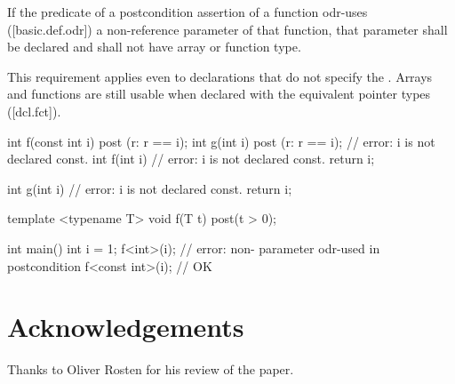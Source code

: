 \begin{adjustwidth}{0.5cm}{0.5cm}
If the predicate of a postcondition assertion of a function odr-uses ([basic.def.odr]) a
non-reference parameter of that function, that parameter shall be declared  and
shall not have array or function type. 
\begin{note}
This requirement applies even to declarations that do not specify the . Arrays and functions are still usable when
declared with the equivalent pointer types ([dcl.fct]). 
\end{note}
\begin{example}
\begin{codeblock}
int f(const int i)
post (r: r == i);
int g(int i)
post (r: r == i); // error: i is not declared const.
int f(int i) // error: i is not declared const.
{
  return i;
}

int g(int i) // error: i is not declared const.
{
  return i;
}
\end{codeblock}
\begin{addedblock}
\begin{codeblock}
template <typename T>
void f(T t) post(t > 0);
  
int main() {
  int i = 1;
  f<int>(i);        // error: non- parameter odr-used in postcondition 
  f<const int>(i);  // OK
}
\end{codeblock}
\end{addedblock}
\end{example}
\end{adjustwidth}


\section*{Acknowledgements}

Thanks to Oliver Rosten for his review of the paper.


\renewcommand{\addcontentsline}[3]{}%







